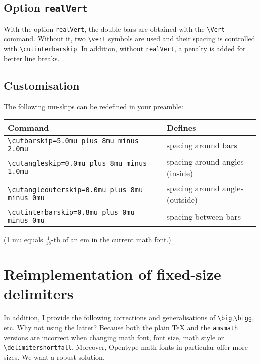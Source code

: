 \documentclass[12pt,a4paper,british]{scrartcl}
\begin{document}
\subsection{Option \texttt{realVert}}

With the option \texttt{realVert}, the double bars are obtained with
the \texttt{\textbackslash{}Vert} command. Without it, two \texttt{\textbackslash{}vert}
symbols are used and their spacing is controlled with  \texttt{\textbackslash{}cutinterbarskip}.
In addition, without \texttt{realVert}, a penalty is added for better
line breaks.


\subsection{Customisation}

The following mu-skips can be redefined in your preamble:

\begin{center}
\begin{tabular}{ll}
\toprule 
Command & Defines\tabularnewline
\midrule
\texttt{\textbackslash{}cutbarskip=5.0mu plus 8mu minus 2.0mu} & spacing around bars\tabularnewline
\texttt{\textbackslash{}cutangleskip=0.0mu plus 8mu minus 1.0mu} & spacing around angles (inside)\tabularnewline
\texttt{\textbackslash{}cutangleouterskip=0.0mu plus 8mu minus 0mu} & spacing around angles (outside)\tabularnewline
\texttt{\textbackslash{}cutinterbarskip=0.8mu plus 0mu minus 0mu} & spacing between bars\tabularnewline
\bottomrule
\end{tabular}
\end{center}

\noindent (1 mu equals $\tfrac{1}{18}$-th of an em in the current
math font.)


\section{Reimplementation of fixed-size delimiters}

In addition, I provide the following corrections and generalisations
of  \texttt{\textbackslash{}big},\texttt{\textbackslash{}bigg}, etc.
Why not using the latter? Because both the plain \TeX{}
and the \texttt{amsmath} versions are incorrect when changing math
font, font size, math style or \texttt{\textbackslash{}delimitershortfall}.
Moreover, Opentype math fonts in  particular offer more sizes. We
want a robust solution.
\end{document}
